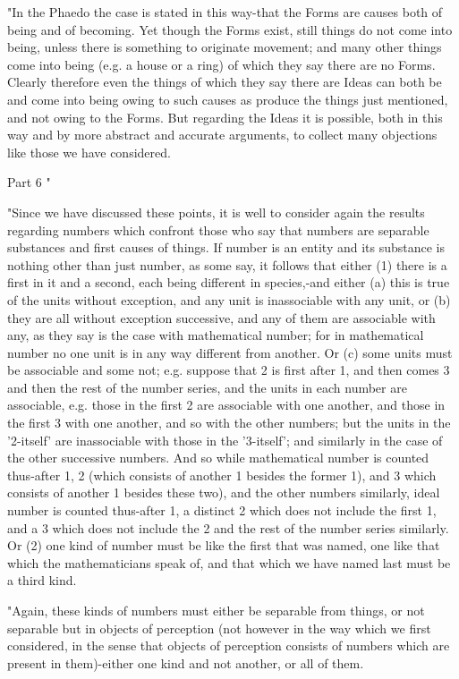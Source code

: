 "In the Phaedo the case is stated in this way-that the Forms are causes
both of being and of becoming. Yet though the Forms exist, still things
do not come into being, unless there is something to originate movement;
and many other things come into being (e.g. a house or a ring) of
which they say there are no Forms. Clearly therefore even the things
of which they say there are Ideas can both be and come into being
owing to such causes as produce the things just mentioned, and not
owing to the Forms. But regarding the Ideas it is possible, both in
this way and by more abstract and accurate arguments, to collect many
objections like those we have considered. 

Part 6 "

"Since we have discussed these points, it is well to consider again
the results regarding numbers which confront those who say that numbers
are separable substances and first causes of things. If number is
an entity and its substance is nothing other than just number, as
some say, it follows that either (1) there is a first in it and a
second, each being different in species,-and either (a) this is true
of the units without exception, and any unit is inassociable with
any unit, or (b) they are all without exception successive, and any
of them are associable with any, as they say is the case with mathematical
number; for in mathematical number no one unit is in any way different
from another. Or (c) some units must be associable and some not; e.g.
suppose that 2 is first after 1, and then comes 3 and then the rest
of the number series, and the units in each number are associable,
e.g. those in the first 2 are associable with one another, and those
in the first 3 with one another, and so with the other numbers; but
the units in the '2-itself' are inassociable with those in the '3-itself';
and similarly in the case of the other successive numbers. And so
while mathematical number is counted thus-after 1, 2 (which consists
of another 1 besides the former 1), and 3 which consists of another
1 besides these two), and the other numbers similarly, ideal number
is counted thus-after 1, a distinct 2 which does not include the first
1, and a 3 which does not include the 2 and the rest of the number
series similarly. Or (2) one kind of number must be like the first
that was named, one like that which the mathematicians speak of, and
that which we have named last must be a third kind. 

"Again, these kinds of numbers must either be separable from things,
or not separable but in objects of perception (not however in the
way which we first considered, in the sense that objects of perception
consists of numbers which are present in them)-either one kind and
not another, or all of them. 

